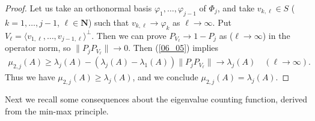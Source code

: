 \documentclass[12pt,a4paper]{article}
\begin{document}
\begin{proof}
Let us take an orthonormal basis 
$\varphi_1,\ldots,\varphi_{j-1}$ of $\Phi_j$,
and take $v_{k,\ell}\in S$ ($k=1,\ldots,j-1$, $\ell\in \mathbf{N}$)
such that
$v_{k,\ell}\to \varphi_k$ as $\ell\to\infty$.
Put $V_\ell=\langle v_{1,\ell},\ldots,v_{j-1,\ell}\rangle^\bot$.
Then we can prove
$P_{V_\ell}\to 1-P_j$ as ($\ell\to\infty$)
in the operator norm,
so $\|P_j P_{V_\ell}\|\to 0$.
Then (\ref{06_05}) implies
\begin{align*}
 \mu_{2,j}(A)
\geq 
\lambda_j(A)-(\lambda_j(A)-\lambda_1(A))\|P_jP_{V_\ell}\|
\to \lambda_j(A) \quad (\ell\to\infty).
\end{align*}
Thus we have $\mu_{2,j}(A)\geq \lambda_j(A)$,
and we conclude $\mu_{2,j}(A)=\lambda_j(A)$.
\end{proof}

Next we recall some consequences about the eigenvalue counting function,
derived from the min-max principle.
\end{document}
